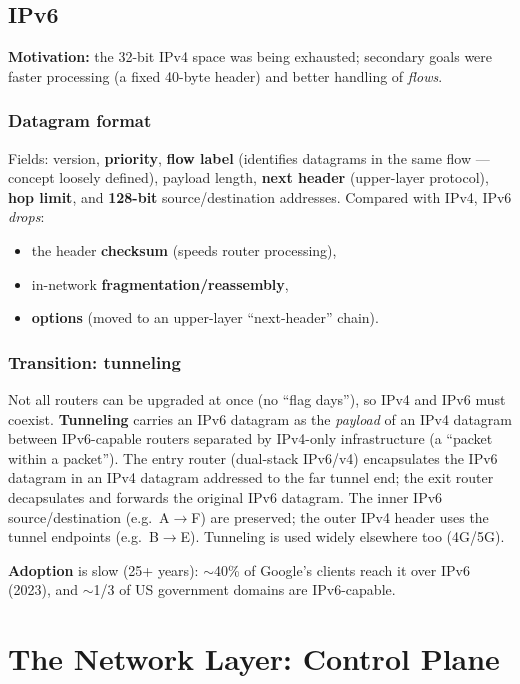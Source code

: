 \documentclass[hidelinks]{article}
\begin{document}
\subsection{IPv6}

\textbf{Motivation:} the 32-bit IPv4 space was being exhausted; secondary
goals were faster processing (a fixed 40-byte header) and better handling of
\emph{flows}.

\subsubsection{Datagram format}
Fields: version, \textbf{priority}, \textbf{flow label} (identifies datagrams
in the same flow --- concept loosely defined), payload length, \textbf{next
header} (upper-layer protocol), \textbf{hop limit}, and \textbf{128-bit}
source/destination addresses. Compared with IPv4, IPv6 \emph{drops}:
\begin{itemize}
    \item the header \textbf{checksum} (speeds router processing),
    \item in-network \textbf{fragmentation/reassembly},
    \item \textbf{options} (moved to an upper-layer ``next-header'' chain).
\end{itemize}

\subsubsection{Transition: tunneling}
Not all routers can be upgraded at once (no ``flag days''), so IPv4 and IPv6
must coexist. \textbf{Tunneling} carries an IPv6 datagram as the
\emph{payload} of an IPv4 datagram between IPv6-capable routers separated by
IPv4-only infrastructure (a ``packet within a packet''). The entry router
(dual-stack IPv6/v4) encapsulates the IPv6 datagram in an IPv4 datagram
addressed to the far tunnel end; the exit router decapsulates and forwards the
original IPv6 datagram. The inner IPv6 source/destination
(e.g.\ A$\to$F) are preserved; the outer IPv4 header uses the tunnel
endpoints (e.g.\ B$\to$E). Tunneling is used widely elsewhere too (4G/5G).

\medskip
\noindent \textbf{Adoption} is slow (25+ years): $\sim$40\% of Google's
clients reach it over IPv6 (2023), and $\sim$1/3 of US government domains are
IPv6-capable.

\section{The Network Layer: Control Plane}
\end{document}
